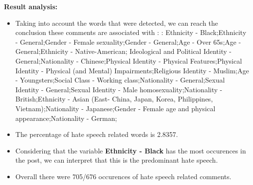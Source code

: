 \documentclass[11pt]{article}
\begin{document}
\textbf{\Large Result analysis:}

\begin{itemize}\item Taking into account the words that were detected, we can reach the conclusion these comments are associated with : : Ethnicity - Black;Ethnicity - General;Gender - Female sexuality;Gender - General;Age - Over 65s;Age - General;Ethnicity - Native-American; Ideological and Political Identity - General;Nationality - Chinese;Physical Identity - Physical Features;Physical Identity - Physical (and Mental) Impairments;Religious Identity - Muslim;Age - Youngsters;Social Class - Working class;Nationality - General;Sexual Identity - General;Sexual Identity - Male homosexuality;Nationality - British;Ethnicity - Asian (East- China, Japan, Korea, Philippines, Vietnam);Nationality - Japanese;Gender - Female age and physical appearance;Nationality - German;%

\item The percentage of hate speech related words is 2.8357.

\item Considering that the variable \textbf{Ethnicity - Black} has the most occurences in the post, we can interpret that this is the predominant hate speech.

\item Overall there were 705/676 occurences of hate speech related comments.\end{itemize}
\end{document}
